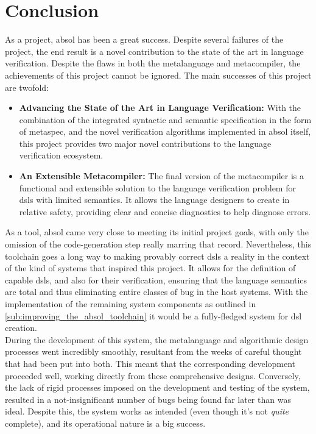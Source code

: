 \chapter{Conclusion} %
\label{cha:conclusion}
As a project, \gls{absol} has been a great success.
Despite several failures of the project, the end result is a novel contribution to the state of the art in language verification. 
Despite the flaws in both the metalanguage and metacompiler, the achievements of this project cannot be ignored. 
The main successes of this project are twofold:
\begin{itemize}
    \item \textbf{Advancing the State of the Art in Language Verification:} With the combination of the integrated syntactic and semantic specification in the form of \gls{metaspec}, and the novel verification algorithms implemented in \gls{absol} itself, this project provides two major novel contributions to the language verification ecosystem.
    \item \textbf{An Extensible Metacompiler:} The final version of the metacompiler is a functional and extensible solution to the language verification problem for \glspl{dsl} with limited semantics.
    It allows the language designers to create in relative safety, providing clear and concise diagnostics to help diagnose errors.
\end{itemize}

As a tool, \gls{absol} came very close to meeting its initial project goals, with only the omission of the code-generation step really marring that record. 
Nevertheless, this toolchain goes a long way to making provably correct \glspl{dsl} a reality in the context of the kind of systems that inspired this project.
It allows for the definition of capable \glspl{dsl}, and also for their verification, ensuring that the language semantics are total and thus eliminating entire classes of bug in the host systems.
With the implementation of the remaining system components as outlined in \autoref{sub:improving_the_absol_toolchain} it would be a fully-fledged system for \gls{dsl} creation.\\

During the development of this system, the metalanguage and algorithmic design processes went incredibly smoothly, resultant from the weeks of careful thought that had been put into both. 
This meant that the corresponding development proceeded well, working directly from these comprehensive designs.
Conversely, the lack of rigid processes imposed on the development and testing of the system, resulted in a not-insignificant number of bugs being found far later than was ideal.
Despite this, the system works as intended (even though it's not \textit{quite} complete), and its operational nature is a big success. \\

